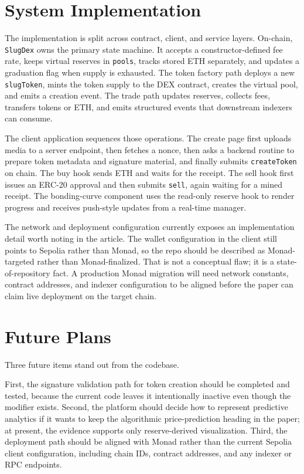 \documentclass[10pt,letterpaper]{article}
\begin{document}
\section{System Implementation}
The implementation is split across contract, client, and service layers. On-chain, \texttt{SlugDex} owns the primary state machine. It accepts a constructor-defined fee rate, keeps virtual reserves in \texttt{pools}, tracks stored ETH separately, and updates a graduation flag when supply is exhausted. The token factory path deploys a new \texttt{slugToken}, mints the token supply to the DEX contract, creates the virtual pool, and emits a creation event. The trade path updates reserves, collects fees, transfers tokens or ETH, and emits structured events that downstream indexers can consume.

The client application sequences those operations. The create page first uploads media to a server endpoint, then fetches a nonce, then asks a backend routine to prepare token metadata and signature material, and finally submits \texttt{createToken} on chain. The buy hook sends ETH and waits for the receipt. The sell hook first issues an ERC-20 approval and then submits \texttt{sell}, again waiting for a mined receipt. The bonding-curve component uses the read-only reserve hook to render progress and receives push-style updates from a real-time manager.

The network and deployment configuration currently exposes an implementation detail worth noting in the article. The wallet configuration in the client still points to Sepolia rather than Monad, so the repo should be described as Monad-targeted rather than Monad-finalized. That is not a conceptual flaw; it is a state-of-repository fact. A production Monad migration will need network constants, contract addresses, and indexer configuration to be aligned before the paper can claim live deployment on the target chain.

\section{Future Plans}
Three future items stand out from the codebase.

First, the signature validation path for token creation should be completed and tested, because the current code leaves it intentionally inactive even though the modifier exists. Second, the platform should decide how to represent predictive analytics if it wants to keep the algorithmic price-prediction heading in the paper; at present, the evidence supports only reserve-derived visualization. Third, the deployment path should be aligned with Monad rather than the current Sepolia client configuration, including chain IDs, contract addresses, and any indexer or RPC endpoints.
\end{document}

